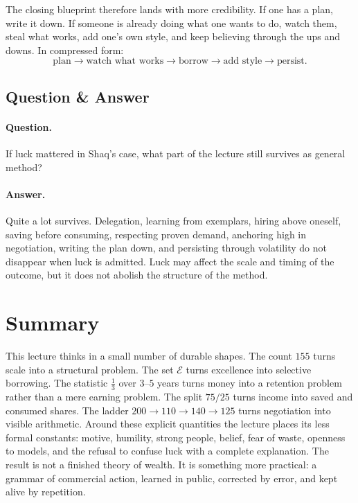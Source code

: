 The closing blueprint therefore lands with more credibility. If one has a plan, write it down. If someone is already doing what one wants to do, watch them, steal what works, add one's own style, and keep believing through the ups and downs. In compressed form:
\begin{equation}
\text{plan} \to \text{watch what works} \to \text{borrow} \to \text{add style} \to \text{persist}.
\end{equation}

\subsection{Question \& Answer}

\paragraph{Question.} If luck mattered in Shaq's case, what part of the lecture still survives as general method?

\paragraph{Answer.} Quite a lot survives. Delegation, learning from exemplars, hiring above oneself, saving before consuming, respecting proven demand, anchoring high in negotiation, writing the plan down, and persisting through volatility do not disappear when luck is admitted. Luck may affect the scale and timing of the outcome, but it does not abolish the structure of the method.

\section{Summary}

This lecture thinks in a small number of durable shapes. The count \(155\) turns scale into a structural problem. The set \(\mathcal{E}\) turns excellence into selective borrowing. The statistic \(\frac{1}{3}\) over \(3\text{--}5\) years turns money into a retention problem rather than a mere earning problem. The split \(75/25\) turns income into saved and consumed shares. The ladder \(200 \to 110 \to 140 \to 125\) turns negotiation into visible arithmetic. Around these explicit quantities the lecture places its less formal constants: motive, humility, strong people, belief, fear of waste, openness to models, and the refusal to confuse luck with a complete explanation. The result is not a finished theory of wealth. It is something more practical: a grammar of commercial action, learned in public, corrected by error, and kept alive by repetition.